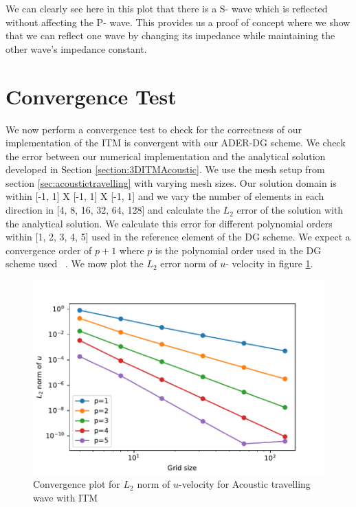 We can clearly see here in this plot that there is a S- wave which is reflected without affecting the P- wave. 
This provides us a proof of concept where we show that we can reflect one wave by changing its impedance while maintaining the other wave's impedance constant. \\



\section{Convergence Test}
We now perform a convergence test to check for the correctness of our implementation of the \ac{ITM} is convergent with our \ac{ADER}-\ac{DG} scheme. 
We check the error between our numerical implementation and the analytical solution developed in Section \ref{section:3DITMAcoustic}. We use the mesh setup
from section \ref{sec:acoustictravelling} with varying mesh sizes. Our solution domain is within [-1, 1] X [-1, 1] X [-1, 1] and we vary the number of elements
in each direction in [4, 8, 16, 32, 64, 128] and calculate the $L_2$ error of the solution with the analytical solution. We calculate this error for different polynomial
orders within [1, 2, 3, 4, 5] used in the reference element of the \ac{DG} scheme. We expect a convergence order of $p+1$ where $p$ is the polynomial order used in the
\ac{DG} scheme used ~\parencite{cockburn2011discontinuous}. We mow plot the $L_2$ error norm of $u$- velocity in figure \ref{fig:convergence}.

\begin{figure}
    \centering
    \includegraphics[width=0.75\linewidth]{figures/error1.pdf}
    \caption{Convergence plot for $L_2$ norm of $u$-velocity for Acoustic travelling wave with \ac{ITM}}
    \label{fig:convergence}
\end{figure}

